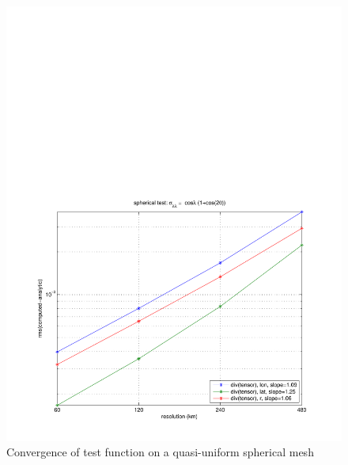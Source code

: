 \documentclass[11pt]{report}
\begin{document}
\begin{figure}[htbp]
 \center
 \includegraphics[scale=0.8, trim = 0 0 0 4in, clip]{f/a19_sph_conv_test_3.pdf}
 \caption{Convergence of test function on a quasi-uniform spherical mesh}
 \label{fig:convergence3}
\end{figure}
\end{document}
